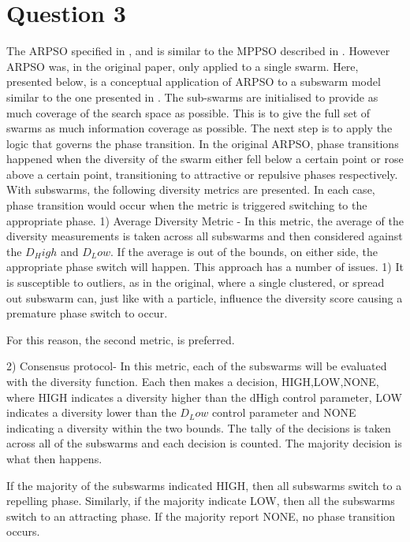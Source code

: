 \documentclass[12pt]{article}
\begin{document}
\section{Question 3}
The ARPSO specified in \cite{Riget02adiversity-guided}, and is similar to the MPPSO described in \cite{al-kazemi_mohan_2000}. However ARPSO was, in the original paper, only applied to a single swarm. Here, presented below, is a conceptual application of ARPSO to a subswarm model similar to the one presented in \cite{vandenbergh_engelbrecht_2004}.
The sub-swarms are initialised to provide as much coverage of the search space as possible. This is to give the full set of swarms as much information coverage as possible. The next step is to apply the logic that governs the phase transition. In the original ARPSO, phase transitions happened when the diversity of the swarm either fell below a certain point or rose above a certain point, transitioning to attractive or repulsive phases respectively.
With subswarms, the following diversity metrics are presented. In each case, phase transition would occur when the metric is triggered switching to the appropriate phase.
1) Average Diversity Metric - In this metric, the average of the diversity measurements is taken across all subswarms and then considered against the $D_High$ and $D_Low$. If the average is out of the bounds, on either side, the appropriate phase switch will happen. This approach has a number of issues. 
	1) It is susceptible to outliers, as in the original, where a single clustered, or spread out subswarm can, just like with a particle, influence the diversity score causing a premature phase switch to occur. 

	For this reason, the second metric, is preferred.

2) Consensus protocol- In this metric, each of the subswarms will be evaluated with the diversity function. Each then makes a decision, HIGH,LOW,NONE, where HIGH indicates a diversity higher than the dHigh control parameter, LOW indicates a diversity lower than the $D_Low$ control parameter and NONE indicating a diversity within the two bounds. The tally of the decisions is taken across all of the subswarms and each decision is counted. The majority decision is what then happens. 

If the majority of the subswarms indicated HIGH, then all subswarms switch to a repelling phase. Similarly, if the majority indicate LOW, then all the subswarms switch to an attracting phase. If the majority report NONE, no phase transition occurs.
\end{document}
